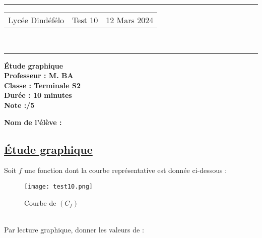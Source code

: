 \documentclass[a4paper,12pt]{article}
\begin{document}
\hrule %
\begin{center}
    \begin{tabular}{@{} p{5cm} p{5cm} p{5cm} @{}} %
        Lycée Dindéfélo & \quad\quad Test 10 & 12 Mars 2024 \\
    \end{tabular}
    \\[-0.01cm] %
    \hrule %
\end{center}
\begin{center}
    \textbf{\Large Étude graphique} \\[0.2cm]
    \textbf{\large Professeur : M. BA} \\[0.2cm]
    \textbf{Classe : Terminale S2} \\[0.2cm]
    \textbf{\small Durée : 10 minutes} \\[0.2cm]
    \textbf{\small Note :\quad\quad /5}
\end{center}

\textbf{\small Nom de l'élève :} \underline{\hspace{8cm}} \\[0.5cm]

\subsection*{\underline{Étude graphique}}
Soit $f$ une fonction dont la courbe représentative est donnée ci-dessous :
\begin{figure}[h]%
\centering
\texttt{[image: test10.png]}
\caption{Courbe de $(C_f)$}
\label{fig:monimage}
\end{figure}\\
Par lecture graphique, donner les valeurs de :\\
\end{document}

